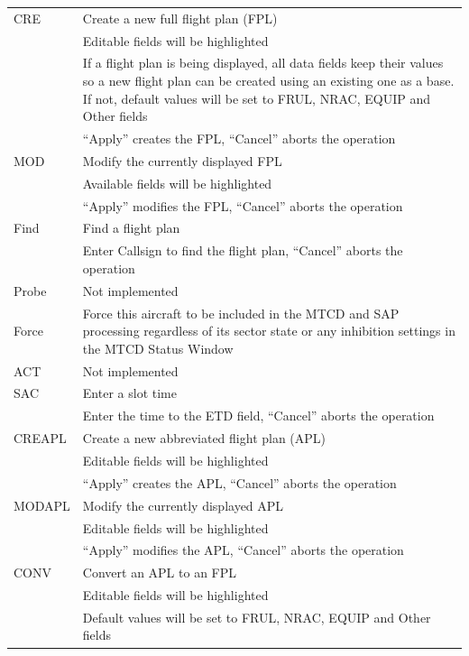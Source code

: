\documentclass[a4paper,oneside,11pt]{memoir}
\begin{document}
\begin{longtable}{p{1.5cm} p{11cm}}
    CRE         & Create a new full flight plan (FPL)\\
                & Editable fields will be highlighted\\
                & If a flight plan is being displayed, all data fields keep their values so a new flight plan can be created using an existing one as a base. If not, default values will be set to FRUL, NRAC, EQUIP and Other fields\\
                & “Apply” creates the FPL, “Cancel” aborts the operation\\
    MOD         & Modify the currently displayed FPL\\
                & Available fields will be highlighted\\
                & “Apply” modifies the FPL, “Cancel” aborts the operation\\
    Find        & Find a flight plan\\
                & Enter Callsign to find the flight plan, “Cancel” aborts the operation\\
    Probe       & Not implemented\\
    Force       & Force this aircraft to be included in the MTCD and SAP processing regardless of its sector state or any inhibition settings in the MTCD Status Window\\
    ACT         & Not implemented\\
    SAC         & Enter a slot time\\
                & Enter the time to the ETD field, “Cancel” aborts the operation\\
    CREAPL      & Create a new abbreviated flight plan (APL)\\
                & Editable fields will be highlighted\\
                & “Apply” creates the APL, “Cancel” aborts the operation\\
    MODAPL      & Modify the currently displayed APL\\
                & Editable fields will be highlighted\\
                & “Apply” modifies the APL, “Cancel” aborts the operation\\
    CONV        & Convert an APL to an FPL\\
                & Editable fields will be highlighted\\
                & Default values will be set to FRUL, NRAC, EQUIP and Other fields\\

\end{longtable}
\end{document}
